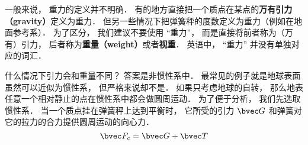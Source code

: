 

一般来说， 重力的定义并不明确． 有的地方直接把一个质点在某点的\textbf{万有引力（gravity）}定义为重力． 但另一些情况下把弹簧秤的度数定义为重力（例如在地面参考系）． 为了区分， 我们建议不要使用 “重力”， 而是直接将前者称为（万有）引力， 后者称为\textbf{重量（weight）}或者\textbf{视重}． 英语中， “重力” 并没有单独对应的词汇．

什么情况下引力会和重量不同？ 答案是非惯性系中． 最常见的例子就是地球表面虽然可以近似为惯性系， 但严格来说却不是． 如果只考虑地球的自转， 那么地表任意一个相对静止的点在惯性系中都会做圆周运动． 为了便于分析， 我们先选取惯性系． 当一个质点挂在弹簧秤上达到平衡时， 它所受的引力 $\bvec G$ 和弹簧对它的拉力的合力提供圆周运动的向心力．
\begin{equation}
\bvec F_c = \bvec G + \bvec T
\end{equation}
